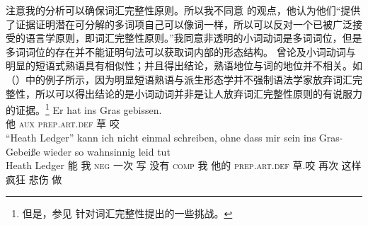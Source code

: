 \begin{exe}
\begin{xlist}[iv.]
\begin{exe}
\begin{xlist}[iv.]
注意我的分析可以确保词汇完整性原则。所以我不同意 \citet*[]{CSP2010a}的观点，他认为他们“提供了证据证明潜在可分解的多词项自己可以像词一样，所以可以反对一个已被广泛接受的语言学原则，即词汇完整性原则。”我同意非透明的小词动词是多词词位，但是多词词位的存在并不能证明句法可以获取词内部的形态结构。 曾论及小词动词与明显的短语式熟语具有相似性；并且得出结论，熟语地位与词的地位并不相关。如（）中的例子所示，因为明显短语熟语与派生形态学并不强制语法学家放弃词汇完整性，所以可以得出结论的是小词动词并非是让人放弃词汇完整性原则的有说服力的证据。\footnote{%
  但是，参见 针对词汇完整性提出的一些挑战。
}
\eal
\ex
\gll Er hat ins Gras gebissen.\\
     他 \textsc{aux} \textsc{prep}.\textsc{art}.\textsc{def} 草 咬\\
\ex 
\gll "`Heath Ledger"' kann ich nicht einmal schreiben, ohne dass mir sein ins Gras-Gebeiße wieder so
wahnsinnig leid tut%
\footnotemark\\
    \spacebr{}Heath Ledger 能 我 \textsc{neg} 一次 写 没有 \textsc{comp} 我 他的 \textsc{prep}.\textsc{art}.\textsc{def} 草.咬 再次 这样
    疯狂 悲伤 做\\

\end{xlist}
\end{exe}
\end{xlist}
\end{exe}

